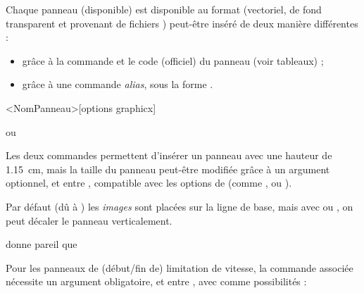 \documentclass[french,11pt,a4paper]{article}
\begin{document}
Chaque panneau (disponible) est disponible au format  (vectoriel, de fond transparent et provenant de fichiers ) peut-être inséré de deux manière différentes :

\begin{itemize}
	\item grâce à la commande  et le code (officiel) du panneau (voir tableaux) ;
	\item grâce à une commande \textit{alias}, sous la forme .
\end{itemize}

\begin{codehigh}[language=latex/latex3,style/main=cyan!5,style/code=cyan!5]
\pr<NomPanneau>[options graphicx]
\end{codehigh}

\begin{demohigh}[language=latex/latex3,style/main=cyan!5,style/code=cyan!5,style/demo=cyan!5]
 ou \prChausRetG
\end{demohigh}

Les deux commandes permettent d'insérer un panneau avec une hauteur de 1.15~cm, mais la taille du panneau peut-être modifiée grâce à un argument optionnel, et entre \MontreCode{[...]}, compatible avec les options de  (comme ,  ou ).

\medskip

Par défaut (dû à ) les \textit{images} sont placées sur la ligne de base, mais avec  ou , on peut décaler le panneau verticalement.

\begin{demohigh}[language=latex/latex3,style/main=cyan!5,style/code=cyan!5,style/demo=cyan!5]
 donne pareil que \raisebox{-0.2\height}{\prInterdTournD[height=2ex]}
\end{demohigh}

\medskip

Pour les panneaux de (début/fin de) limitation de vitesse, la commande associée nécessite un argument obligatoire, et entre , avec comme possibilités  :

\begin{demohigh}[language=latex/latex3,style/main=cyan!5,style/code=cyan!5,style/demo=cyan!5]
\end{demohigh}
\end{document}
